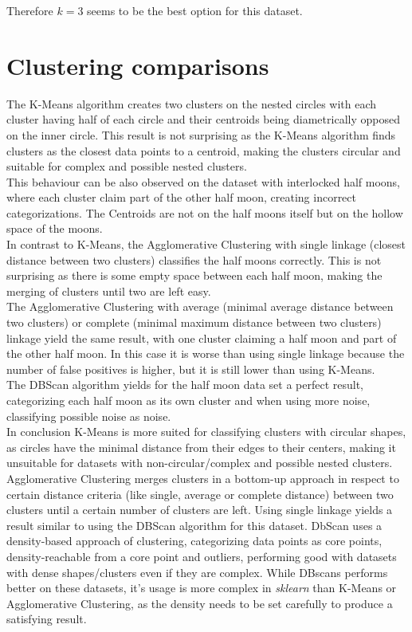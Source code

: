 \documentclass[a4paper, 11pt]{article}
\begin{document}
Therefore $k=3$ seems to be the best option for this dataset.
\section{Clustering comparisons}
The K-Means algorithm creates two clusters on the nested circles with each cluster having half of each circle and their centroids being diametrically opposed on the inner circle. This result is not surprising as the K-Means algorithm finds clusters as the closest data points to a centroid, making the clusters circular and suitable for complex and possible nested clusters.\\
This behaviour can be also observed on the dataset with interlocked half moons, where each cluster claim part of the other half moon, creating incorrect categorizations. The Centroids are not on the half moons itself but on the hollow space of the moons.\\
In contrast to K-Means, the Agglomerative Clustering with single linkage (closest distance between two clusters) classifies the half moons correctly. This is not surprising as there is some empty space between each half moon, making the merging of clusters until two are left easy.\\
The Agglomerative Clustering with average (minimal average distance between two clusters) or complete (minimal maximum distance between two clusters) linkage yield the same result, with one cluster claiming a half moon and part of the other half moon. In this case it is worse than using single linkage because the number of false positives is higher, but it is still lower than using K-Means.\\
The DBScan algorithm yields for the half moon data set a perfect result, categorizing each half moon as its own cluster and when using more noise, classifying possible noise as noise.\\
In conclusion K-Means is more suited for classifying clusters with circular shapes, as circles have the minimal distance from their edges to their centers, making it unsuitable for datasets with non-circular/complex and possible nested clusters. Agglomerative Clustering merges clusters in a bottom-up approach in respect to certain distance criteria (like single, average or complete distance) between two clusters until a certain number of clusters are left. Using single linkage yields a result similar to using the DBScan algorithm for this dataset.
DbScan uses a density-based approach of clustering, categorizing data points as core points, density-reachable from a core point and outliers, performing good with datasets with dense shapes/clusters even if they are complex. While DBscans performs better on these datasets, it's usage is more complex in \textit{sklearn} than K-Means or Agglomerative Clustering, as the density needs to be set carefully to produce a satisfying result.
\end{document}
